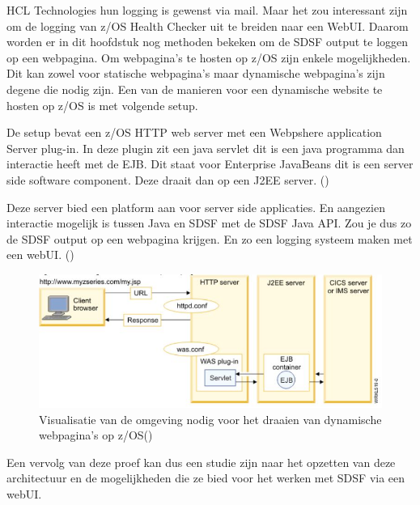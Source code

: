 HCL Technologies hun logging is gewenst via mail. Maar het zou interessant zijn om de logging van z/OS Health Checker uit te breiden naar een WebUI. Daarom worden er in dit hoofdstuk nog methoden bekeken om de SDSF output te loggen op een webpagina. Om webpagina's te hosten op z/OS zijn enkele mogelijkheden. Dit kan zowel voor statische webpagina's maar dynamische webpagina's zijn degene die nodig zijn. Een van de manieren voor een dynamische website te hosten op z/OS is met volgende setup.

De setup bevat een z/OS HTTP web server met een Webpshere application Server plug-in. In deze plugin zit een java servlet dit is een java programma dan interactie heeft met de EJB. Dit staat voor Enterprise JavaBeans dit is een server side software component. Deze draait dan op een J2EE server. (\cite{IBM2010})

Deze server bied een platform aan voor server side applicaties. En aangezien interactie mogelijk is tussen Java en SDSF met de SDSF Java API. Zou je dus zo de SDSF output op een webpagina krijgen. En zo een logging systeem maken met een webUI. (\cite{Vilaghy2002})

\begin{figure}[h]
	\centering
	\includegraphics{img/WebpshereApplicationServer}
	\caption[Websphere Application Server]{Visualisatie van de omgeving nodig voor het draaien van dynamische webpagina's op z/OS(\cite{IBM2010})}
	\label{fig:webpshereapplicationserver}
\end{figure}


Een vervolg van deze proef kan dus een studie zijn naar het opzetten van deze architectuur en de mogelijkheden die ze bied voor het werken met SDSF via een webUI.





